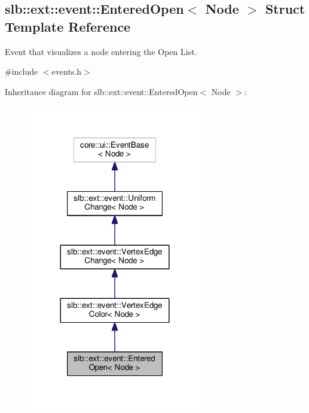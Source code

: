 \hypertarget{structslb_1_1ext_1_1event_1_1EnteredOpen}{}\subsection{slb\+:\+:ext\+:\+:event\+:\+:Entered\+Open$<$ Node $>$ Struct Template Reference}
\label{structslb_1_1ext_1_1event_1_1EnteredOpen}


Event that visualizes a node entering the Open List.  




{\ttfamily \#include $<$events.\+h$>$}



Inheritance diagram for slb\+:\+:ext\+:\+:event\+:\+:Entered\+Open$<$ Node $>$\+:\nopagebreak
\begin{figure}[H]
\begin{center}
\leavevmode
\includegraphics[width=216pt]{structslb_1_1ext_1_1event_1_1EnteredOpen__inherit__graph}
\end{center}
\end{figure}


